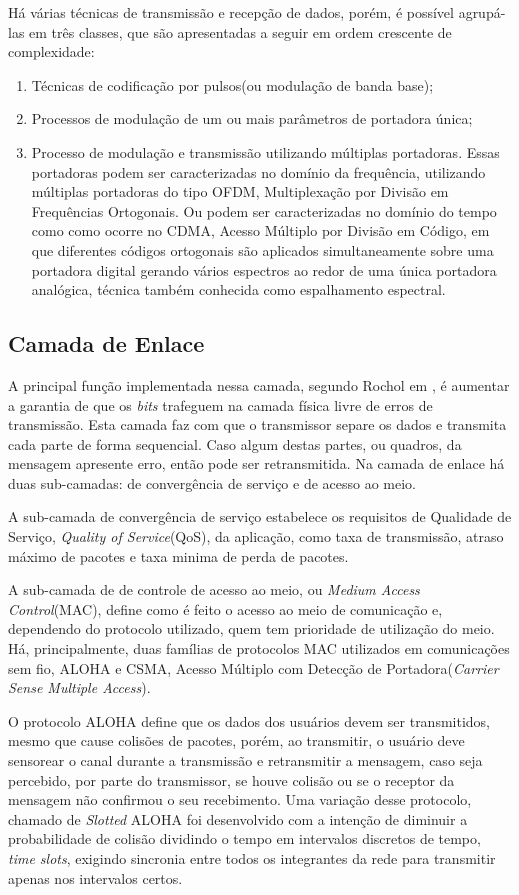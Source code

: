 Há várias técnicas de transmissão e recepção de dados, porém, é possível agrupá-las em três classes, que são apresentadas a seguir em ordem crescente de complexidade:
\begin{enumerate}
      \item Técnicas de codificação por pulsos(ou modulação de banda base);
      \item Processos de modulação de um ou mais parâmetros de portadora única;
      \item Processo de modulação e transmissão utilizando múltiplas portadoras. Essas portadoras podem ser caracterizadas no domínio da frequência, utilizando múltiplas portadoras do tipo OFDM, Multiplexação por Divisão em Frequências Ortogonais. Ou podem ser caracterizadas no domínio do tempo como como ocorre no CDMA, Acesso Múltiplo por Divisão em Código, em que diferentes códigos ortogonais são aplicados simultaneamente sobre uma portadora digital gerando vários espectros ao redor de uma única portadora analógica, técnica também conhecida como espalhamento espectral.
\end{enumerate}

\subsection{Camada de Enlace}
A principal função implementada nessa camada, segundo Rochol em \cite{rochol2018sistemas}, é aumentar a garantia de que os \emph{bits} trafeguem na camada física livre de erros de transmissão. Esta camada faz com que o transmissor separe os dados e transmita cada parte de forma sequencial. Caso algum destas partes, ou quadros, da mensagem apresente erro, então pode ser retransmitida. Na camada de enlace há duas sub-camadas: de convergência de serviço e de acesso ao meio.

A sub-camada de convergência de serviço estabelece os requisitos de Qualidade de Serviço, \emph{Quality of Service}(QoS), da aplicação, como taxa de transmissão, atraso máximo de pacotes e taxa minima de perda de pacotes.

A sub-camada de de controle de acesso ao meio, ou \emph{Medium Access Control}(MAC), define como é feito o acesso ao meio de comunicação e, dependendo do protocolo utilizado, quem tem prioridade de utilização do meio. Há, principalmente, duas famílias de protocolos MAC utilizados em comunicações sem fio, ALOHA e CSMA, Acesso Múltiplo com Detecção de Portadora(\emph{Carrier Sense Multiple Access}).

O protocolo ALOHA define que os dados dos usuários devem ser transmitidos, mesmo que cause colisões de pacotes, porém, ao transmitir, o usuário deve sensorear o canal durante a transmissão e retransmitir a mensagem, caso seja percebido, por parte do transmissor, se houve colisão ou se o receptor da mensagem não confirmou o seu recebimento. Uma variação desse protocolo, chamado de \emph{Slotted} ALOHA foi desenvolvido com a intenção de diminuir a probabilidade de colisão dividindo o tempo em intervalos discretos de tempo, \emph{time slots}, exigindo sincronia entre todos os integrantes da rede para transmitir apenas nos intervalos certos.


